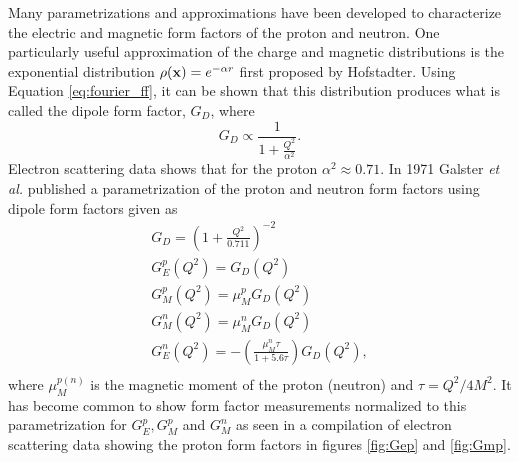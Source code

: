 Many parametrizations and approximations have been developed to characterize the electric and magnetic form factors of the proton and neutron. One particularly useful approximation of the charge and magnetic distributions is the exponential distribution $\rho({\bf x})=e^{-\alpha r}$ first proposed by Hofstadter\cite{Hofstadter}. Using Equation \ref{eq:fourier_ff}, it can be shown that this distribution produces what is called the dipole form factor, $G_D$, where
\[
G_D\propto\frac{1}{1+\frac{Q^2}{\alpha^2}}.
\]
Electron scattering data shows that for the proton $\alpha^2\approx 0.71$. In 1971 Galster {\it et al.} published a parametrization of the proton and neutron form factors using dipole form factors given as \cite{Galster}
\begin{equation}
\begin{array}{c}
G_D=\left(1+\frac{Q^2}{0.711}\right)^{-2}\\
G_E^p(Q^2)=G_D(Q^2)\\
G_M^p(Q^2)=\mu_M^pG_D(Q^2)\\
G_M^n(Q^2)=\mu_M^nG_D(Q^2)\\
G_E^n(Q^2)=-\left(\frac{\mu_M^n\tau}{1+5.6\tau}\right)G_D(Q^2),\\
\end{array}
\label{eq:galster_ff}
\end{equation}
where $\mu_M^{p(n)}$ is the magnetic moment of the proton (neutron) and $\tau=Q^2/4M^2$. It has become common to show form factor measurements normalized to this parametrization for $G_E^p, G_M^p$ and $G_M^n$ as seen in a compilation of electron scattering data showing the proton form factors in figures \ref{fig:Gep} and  \ref{fig:Gmp}.

